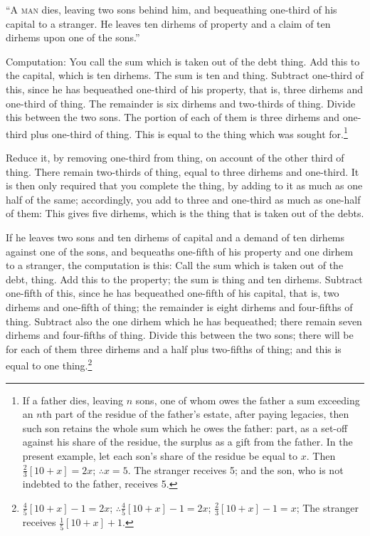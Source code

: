 ``A \textsc{man} dies, leaving two sons behind him, and bequeathing one-third of his capital to a stranger. He leaves ten dirhems of property and a claim of ten dirhems upon one of the sons.''

Computation: You call the sum which is taken out of the debt thing. Add this to the capital, which is ten dirhems. The sum is ten and thing. Subtract one-third of this, since he has bequeathed one-third of his property, that is, three dirhems and one-third of thing. The remainder is six dirhems and two-thirds of thing. Divide this between the two sons. The portion of each of them is three dirhems and one-third plus one-third of thing. This is equal to the thing which was sought for.\footnote{If a father dies, leaving $n$ sons, one of whom owes the father a sum exceeding an $n$th part of the residue of the father's estate, after paying legacies, then such son retains the whole sum which he owes the father: part, as a set-off against his share of the residue, the surplus as a gift from the father. In the present example, let each son's share of the residue be equal to $x$. Then $\frac{2}{3}[10+x] = 2x$; $\therefore x = 5$. The stranger receives 5; and the son, who is not indebted to the father, receives 5.}

Reduce it, by removing one-third from thing, on account of the other third of thing. There remain two-thirds of thing, equal to three dirhems and one-third. It is then only required that you complete the thing, by adding to it as much as one half of the same; accordingly, you add to three and one-third as much as one-half of them: This gives five dirhems, which is the thing that is taken out of the debts.

If he leaves two sons and ten dirhems of capital and a demand of ten dirhems against one of the sons, and bequeaths one-fifth of his property and one dirhem to a stranger, the computation is this: Call the sum which is taken out of the debt, thing. Add this to the property; the sum is thing and ten dirhems. Subtract one-fifth of this, since he has bequeathed one-fifth of his capital, that is, two dirhems and one-fifth of thing; the remainder is eight dirhems and four-fifths of thing. Subtract also the one dirhem which he has bequeathed; there remain seven dirhems and four-fifths of thing. Divide this between the two sons; there will be for each of them three dirhems and a half plus two-fifths of thing; and this is equal to one thing.\footnote{$\frac{4}{5}[10+x] - 1 = 2x$; $\therefore \frac{4}{5}[10+x] - 1 = 2x$; $\frac{2}{3}[10+x] - 1 = x$; The stranger receives $\frac{1}{5}[10+x] + 1$.}

